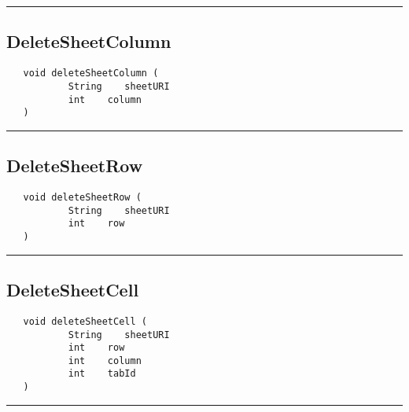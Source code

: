\rule{15cm}{2pt}
\subsection{DeleteSheetColumn}
\label{Api:DeleteSheetColumn}
\begin{verbatim}
   void deleteSheetColumn (
           String    sheetURI
           int    column
   )
\end{verbatim}



\rule{15cm}{2pt}
\subsection{DeleteSheetRow}
\label{Api:DeleteSheetRow}
\begin{verbatim}
   void deleteSheetRow (
           String    sheetURI
           int    row
   )
\end{verbatim}



\rule{15cm}{2pt}
\subsection{DeleteSheetCell}
\label{Api:DeleteSheetCell}
\begin{verbatim}
   void deleteSheetCell (
           String    sheetURI
           int    row
           int    column
           int    tabId
   )
\end{verbatim}



\rule{15cm}{2pt}
